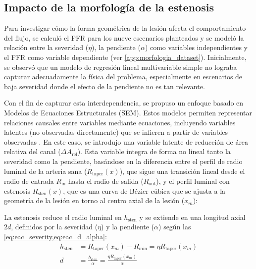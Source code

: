 \documentclass[12pt, letterpaper]{article}
\begin{document}
\subsection{Impacto de la morfología de la estenosis} \label{sec:impacto_morfologia_estenosis}

Para investigar cómo la forma geométrica de la lesión afecta el comportamiento del flujo, se calculó el FFR para los nueve escenarios planteados y se modeló la relación entre la severidad ($\eta$), la pendiente ($\alpha$) como variables independientes y el FFR como variable dependiente (ver \cref{app:morfologia_dataset}). Inicialmente, se observó que un modelo de regresión lineal multivariable simple no lograba capturar adecuadamente la física del problema, especialmente en escenarios de baja severidad donde el efecto de la pendiente no es tan relevante.

Con el fin de capturar esta interdependencia, se propuso un enfoque basado en Modelos de Ecuaciones Estructurales (SEM). Estos modelos permiten representar relaciones causales entre variables mediante ecuaciones, incluyendo variables latentes (no observadas directamente) que se infieren a partir de variables observadas \cite{sem}. En este caso, se introdujo una variable latente de reducción de área relativa del canal ($\Delta A_{\text{rel}}$). Esta variable integra de forma no lineal tanto la severidad como la pendiente, basándose en la diferencia entre el perfil de radio luminal de la arteria sana ($R_{\mathrm{taper}}(x)$), que sigue una transición lineal desde el radio de entrada $R_{\mathrm{in}}$ hasta el radio de salida ($R_{\mathrm{out}}$), y el perfil luminal con estenosis $R_{\mathrm{sten}}(x)$, que es una curva de Bézier cúbica que se ajusta a la geometría de la lesión en torno al centro axial de la lesión ($x_m$):

La estenosis reduce el radio luminal en $h_{\mathrm{sten}}$ y se extiende en una longitud axial $2d$, definidos por la severidad ($\eta$) y la pendiente ($\alpha$) según las \cref{eq:eac_severity,eq:eac_d_alpha}:
\begin{align*}
  h_{\mathrm{sten}} &= R_{\mathrm{taper}}(x_m) - R_{\min} = \eta R_{\mathrm{taper}}(x_m) \\
  d &= \frac{h_{\mathrm{sten}}}{\alpha} = \frac{\eta R_{\mathrm{taper}}(x_m)}{\alpha}
\end{align*}
\end{document}
